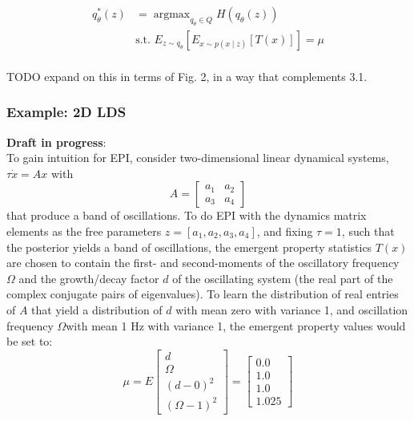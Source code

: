 \documentclass[11pt]{article}
\DeclareMathOperator*{\argmax}{argmax}
\begin{document}
\begin{equation}
\begin{split}
q_\theta^*(z) &= \argmax_{q_\theta \in Q} H(q_\theta(z)) \\
 &  \text{s.t.  } E_{z \sim q_\theta}\left[ E_{x\sim p(x \mid z)}\left[T(x)\right] \right] = \mu \\
 \end{split}
\end{equation}

TODO expand on this in terms of Fig. 2, in a way that complements 3.1.

\subsubsection{Example: 2D LDS}\label{methods_2DLDS}
\textbf{Draft in progress}: \\
To gain intuition for EPI, consider two-dimensional linear dynamical systems, $\tau \dot{x} = Ax$ with 
\[A = \begin{bmatrix} a_1 & a_2 \\ a_3 & a_4 \end{bmatrix}\]
 that produce a band of oscillations. To do EPI with the dynamics matrix elements as the free parameters $z = \left[a_1, a_2, a_3, a_4 \right]$, and fixing $\tau=1$, such that the posterior yields a band of oscillations, the emergent property statistics $T(x)$ are chosen to contain the first- and second-moments of the oscillatory frequency $\Omega$ and the growth/decay factor $d$ of the oscillating system (the real part of the complex conjugate pairs of eigenvalues).  To learn the distribution of real entries of $A$ that yield a distribution of $d$ with mean zero with variance 1, and oscillation frequency $\Omega$with mean 1 Hz with variance 1, the emergent property values would be set to:
\begin{equation}
 \mu = E \begin{bmatrix} d \\ \Omega \\ (d-0)^2 \\ (\Omega-1)^2 \end{bmatrix} = \begin{bmatrix} 0.0 \\ 1.0 \\ 1.0 \\ 1.025 \end{bmatrix}
 \end{equation} 
 
\end{document}
